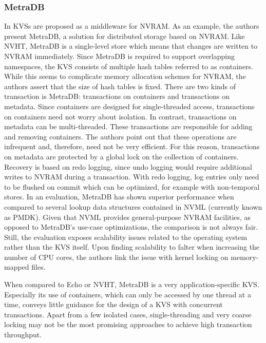 \subsubsection{MetraDB}

In \cite{marmol2016nonvolatile} \acp{KVS} are proposed as a middleware for
\ac{NVRAM}. As an example, the authors present MetraDB, a solution for
distributed storage based on \ac{NVRAM}. Like NVHT, MetraDB is a single-level
store which means that changes are written to \ac{NVRAM} immediately. Since
MetraDB is required to support overlapping namespaces, the \ac{KVS} consists of
multiple hash tables referred to as containers. While this seems to complicate
memory allocation schemes for \ac{NVRAM}, the authors assert that the size of
hash tables is fixed. There are two kinds of transaction is MetraDB:
transactions on containers and transactions on metadata. Since containers are
designed for single-threaded access, transactions on containers need not worry
about isolation. In contrast, transactions on metadata can be multi-threaded.
These transactions are responsible for adding and removing containers. The
authors point out that these operations are infrequent and, therefore, need not
be very efficient. For this reason, transactions on metadata are protected by a
global lock on the collection of containers. Recovery is based on redo logging,
since undo logging would require additional writes to \ac{NVRAM} during a
transaction. With redo logging, log entries only need to be flushed on commit
which can be optimized, for example with non-temporal stores. In an evaluation,
MetraDB has shown superior performance when compared to several lookup data
structures contained in NVML (currently known as PMDK). Given that NVML provides
general-purpose \ac{NVRAM} facilities, as opposed to MetraDB's use-case
optimizations, the comparison is not always fair. Still, the evaluation exposes
scalability issues related to the operating system rather than the \ac{KVS}
itself. Upon finding scalability to falter when increasing the number of
\ac{CPU} cores, the authors link the issue with kernel locking on memory-mapped
files.

When compared to Echo or NVHT, MetraDB is a very application-specific \ac{KVS}.
Especially its use of containers, which can only be accessed by one thread at a
time, conveys little guidance for the design of a \ac{KVS} with concurrent
transactions. Apart from a few isolated cases, single-threading and very coarse
locking may not be the most promising approaches to achieve high transaction
throughput.
